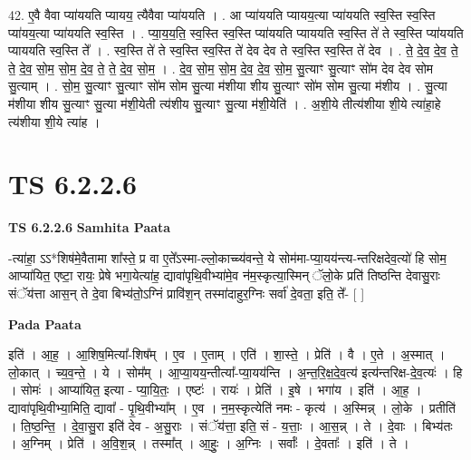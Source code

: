 \documentclass[17pt]{extarticle}
\begin{document}
42. ए॒वै वैवा प्या॑ययति प्यायय॒ त्यैवैवा प्या॑ययति । . आ प्या॑ययति प्यायय॒त्या प्या॑ययति स्व॒स्ति स्व॒स्ति प्या॑यय॒त्या प्या॑ययति स्व॒स्ति । . प्या॒य॒य॒ति॒ स्व॒स्ति स्व॒स्ति प्या॑ययति प्याययति स्व॒स्ति ते॑ ते स्व॒स्ति प्या॑ययति प्याययति स्व॒स्ति ते᳚ । . स्व॒स्ति ते॑ ते स्व॒स्ति स्व॒स्ति ते॑ देव देव ते स्व॒स्ति स्व॒स्ति ते॑ देव । . ते॒ दे॒व॒ दे॒व॒ ते॒ ते॒ दे॒व॒ सो॒म॒ सो॒म॒ दे॒व॒ ते॒ ते॒ दे॒व॒ सो॒म॒ । . दे॒व॒ सो॒म॒ सो॒म॒ दे॒व॒ दे॒व॒ सो॒म॒ सु॒त्याꣳ सु॒त्याꣳ सो॑म देव देव सोम सु॒त्याम् । . सो॒म॒ सु॒त्याꣳ सु॒त्याꣳ सो॑म सोम सु॒त्या म॑शीया शीय सु॒त्याꣳ सो॑म सोम सु॒त्या म॑शीय । . सु॒त्या म॑शीया शीय सु॒त्याꣳ सु॒त्या म॑शी॒येती त्य॑शीय सु॒त्याꣳ सु॒त्या म॑शी॒येति॑ । . अ॒शी॒ये तीत्य॑शीया शी॒ये त्या॑हा॒हे त्य॑शीया शी॒ये त्या॑ह । \newline
\pagebreak
{}

\section{ TS 6.2.2.6 }

\textbf{TS 6.2.2.6 } \newline
\textbf{Samhita Paata} \newline

-त्या॑हा॒ ऽऽ*शिष॑मे॒वैतामा शा᳚स्ते॒ प्र वा ए॒ते᳚ऽस्मा-ल्लो॒काच्च्य॑वन्ते॒ ये सोम॑मा-प्या॒यय॑न्त्य-न्तरिक्षदेव॒त्यो॑ हि सोम॒ आप्या॑यित॒ एष्टा॒ रायः॒ प्रेषे भगा॒येत्या॑ह॒ द्यावा॑पृथि॒वीभ्या॑मे॒व न॑म॒स्कृत्या॒स्मिन् ॅलो॒के प्रति॑ तिष्ठन्ति देवासु॒राः संॅय॑त्ता आस॒न् ते दे॒वा बिभ्य॑तो॒ऽग्निं प्रावि॑श॒न् तस्मा॑दाहुर॒ग्निः सर्वा॑ दे॒वता॒ इति॒ ते᳚- [  ] \newline

\textbf{Pada Paata} \newline

इति॑ । आ॒ह॒ । आ॒शिष॒मित्या᳚-शिष᳚म् । ए॒व । ए॒ताम् । एति॑ । शा॒स्ते॒ । प्रेति॑ । वै । ए॒ते । अ॒स्मात् । लो॒कात् । च्य॒व॒न्ते॒ । ये । सोम᳚म् । आ॒प्या॒यय॒न्तीत्या᳚-प्या॒यय॑न्ति । अ॒न्त॒रि॒क्ष॒दे॒व॒त्य॑ इत्य॑न्तरिक्ष-दे॒व॒त्यः॑ । हि । सोमः॑ । आप्या॑यित॒ इत्या - प्या॒यि॒तः॒ । एष्टः॑ । रायः॑ । प्रेति॑ । इ॒षे । भगा॑य । इति॑ । आ॒ह॒ । द्यावा॑पृथि॒वीभ्या॒मिति॒ द्यावा᳚ - पृ॒थि॒वीभ्या᳚म् । ए॒व । न॒म॒स्कृत्येति॑ नमः - कृत्य॑ । अ॒स्मिन्न् । लो॒के । प्रतीति॑ । ति॒ष्ठ॒न्ति॒ । दे॒वा॒सु॒रा इति॑ देव - अ॒सु॒राः । संॅय॑त्ता॒ इति॒ सं - य॒त्ताः॒ । आ॒स॒न्न् । ते । दे॒वाः । बिभ्य॑तः । अ॒ग्निम् । प्रेति॑ । अ॒वि॒श॒न्न् । तस्मा᳚त् । आ॒हुः॒ । अ॒ग्निः । सर्वाः᳚ । दे॒वताः᳚ । इति॑ । ते ।  \newline
\end{document}
